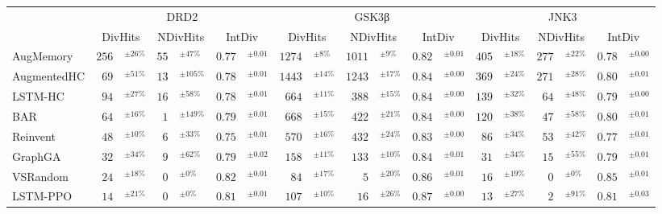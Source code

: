 \begin{tabular}{lr@{}lr@{}lr@{}lr@{}lr@{}lr@{}lr@{}lr@{}lr@{}l}
\toprule
 & \multicolumn{6}{c}{DRD2} & \multicolumn{6}{c}{GSK3β} & \multicolumn{6}{c}{JNK3} \\
\cmidrule(lr){2-7} \cmidrule(lr){8-13} \cmidrule(lr){14-19}
 & \multicolumn{2}{c}{DivHits} & \multicolumn{2}{c}{NDivHits} & \multicolumn{2}{c}{IntDiv} & \multicolumn{2}{c}{DivHits} & \multicolumn{2}{c}{NDivHits} & \multicolumn{2}{c}{IntDiv} & \multicolumn{2}{c}{DivHits} & \multicolumn{2}{c}{NDivHits} & \multicolumn{2}{c}{IntDiv} \\
\midrule
AugMemory & $256$& $^{\pm26\%}$ & $55$& $^{\pm47\%}$ & $0.77$& $^{\pm0.01}$ & $1274$& $^{\pm8\%}$ & $1011$& $^{\pm9\%}$ & $0.82$& $^{\pm0.01}$ & $405$& $^{\pm18\%}$ & $277$& $^{\pm22\%}$ & $0.78$& $^{\pm0.00}$ \\
AugmentedHC & $69$& $^{\pm51\%}$ & $13$& $^{\pm105\%}$ & $0.78$& $^{\pm0.01}$ & $1443$& $^{\pm14\%}$ & $1243$& $^{\pm17\%}$ & $0.84$& $^{\pm0.00}$ & $369$& $^{\pm24\%}$ & $271$& $^{\pm28\%}$ & $0.80$& $^{\pm0.01}$ \\
LSTM-HC & $94$& $^{\pm27\%}$ & $16$& $^{\pm58\%}$ & $0.78$& $^{\pm0.01}$ & $664$& $^{\pm11\%}$ & $388$& $^{\pm15\%}$ & $0.84$& $^{\pm0.00}$ & $139$& $^{\pm32\%}$ & $64$& $^{\pm48\%}$ & $0.79$& $^{\pm0.00}$ \\
BAR & $64$& $^{\pm16\%}$ & $1$& $^{\pm149\%}$ & $0.79$& $^{\pm0.01}$ & $668$& $^{\pm15\%}$ & $422$& $^{\pm21\%}$ & $0.84$& $^{\pm0.00}$ & $120$& $^{\pm38\%}$ & $47$& $^{\pm58\%}$ & $0.80$& $^{\pm0.01}$ \\
Reinvent & $48$& $^{\pm10\%}$ & $6$& $^{\pm33\%}$ & $0.75$& $^{\pm0.01}$ & $570$& $^{\pm16\%}$ & $432$& $^{\pm24\%}$ & $0.83$& $^{\pm0.00}$ & $86$& $^{\pm34\%}$ & $53$& $^{\pm42\%}$ & $0.77$& $^{\pm0.01}$ \\
GraphGA & $32$& $^{\pm34\%}$ & $9$& $^{\pm62\%}$ & $0.79$& $^{\pm0.02}$ & $158$& $^{\pm11\%}$ & $133$& $^{\pm10\%}$ & $0.84$& $^{\pm0.01}$ & $31$& $^{\pm34\%}$ & $15$& $^{\pm55\%}$ & $0.79$& $^{\pm0.01}$ \\
VSRandom & $24$& $^{\pm18\%}$ & $0$& $^{\pm0\%}$ & $0.82$& $^{\pm0.01}$ & $84$& $^{\pm17\%}$ & $5$& $^{\pm20\%}$ & $0.86$& $^{\pm0.01}$ & $16$& $^{\pm19\%}$ & $0$& $^{\pm0\%}$ & $0.85$& $^{\pm0.01}$ \\
LSTM-PPO & $14$& $^{\pm21\%}$ & $0$& $^{\pm0\%}$ & $0.81$& $^{\pm0.01}$ & $107$& $^{\pm10\%}$ & $16$& $^{\pm26\%}$ & $0.87$& $^{\pm0.00}$ & $13$& $^{\pm27\%}$ & $2$& $^{\pm91\%}$ & $0.81$& $^{\pm0.03}$ \\

\end{tabular}
